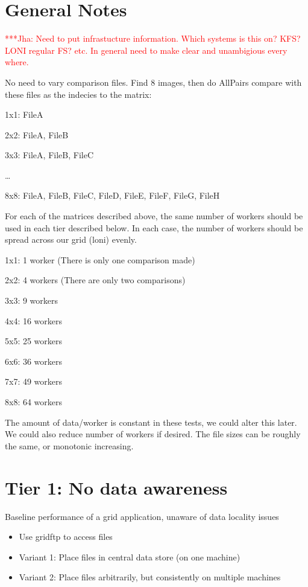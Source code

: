 \documentclass[a4paper,12pt]{article}
\newcommand{\jhanote}[1]{ {\textcolor{red} { ***Jha: #1 }}}
\newcommand{\jhanote}[1]{}
\begin{document}
\section{General Notes}

\jhanote{Need to put infrastucture information. Which systems is this on?  KFS? LONI regular FS? etc. In general need to make clear and unambigious every where.}

No need to vary comparison files.  Find 8 images, then do AllPairs compare with these files as the indecies to the matrix:

1x1: FileA

2x2: FileA, FileB

3x3: FileA, FileB, FileC

\ldots

8x8: FileA, FileB, FileC, FileD, FileE, FileF, FileG, FileH

For each of the matrices described above, the same number of workers should be used in each tier described below.  In each case, the number of workers should be spread across our grid (loni) evenly.

1x1: 1 worker (There is only one comparison made)

2x2: 4 workers (There are only two comparisons)

3x3: 9 workers

4x4: 16 workers

5x5: 25 workers

6x6: 36 workers

7x7: 49 workers

8x8: 64 workers

The amount of data/worker is constant in these tests, we could alter this later. We could also reduce number of workers if desired.
The file sizes can be roughly the same, or monotonic increasing.

\section{Tier 1: No data awareness}
Baseline performance of a grid application, unaware of data locality issues
\begin{itemize}
\item Use gridftp to access files
\item Variant 1: Place files in central data store (on one machine)
\item Variant 2: Place files arbitrarily, but consistently on multiple machines
\end{itemize}
\end{document}
